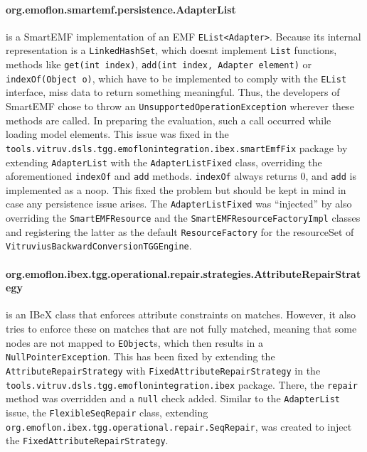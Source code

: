 \paragraph{org.emoflon.smartemf.persistence.AdapterList} is a SmartEMF implementation of an EMF \texttt{EList<Adapter>}.
Because its internal representation is a \texttt{LinkedHashSet}, which doesnt implement \texttt{List} functions, methods like \texttt{get(int index)}, \texttt{add(int index, Adapter element)} or \texttt{indexOf(Object o)}, which have to be implemented to comply with the \texttt{EList} interface, miss data to return something meaningful. Thus, the developers of SmartEMF chose to throw an \texttt{UnsupportedOperationException} wherever these methods are called.
In preparing the evaluation, such a call occurred while loading model elements.
This issue was fixed in the \texttt{tools.vitruv.dsls.tgg.emoflonintegration.ibex.smartEmfFix} package by extending \texttt{AdapterList} with the \texttt{AdapterListFixed} class, overriding the aforementioned \texttt{indexOf} and \texttt{add} methods. \texttt{indexOf} always returns $0$, and \texttt{add} is implemented as a noop. This fixed the problem but should be kept in mind in case any persistence issue arises.
The \texttt{AdapterListFixed} was \enquote{injected} by also overriding the \texttt{SmartEMFResource} and the \texttt{SmartEMFResourceFactoryImpl} classes and registering the latter as the default \texttt{ResourceFactory} for the resourceSet of \texttt{VitruviusBackwardConversionTGGEngine}.

\paragraph{org.emoflon.ibex.tgg.operational.repair.strategies.AttributeRepairStrategy} is an IBeX class that enforces attribute constraints on matches. However, it also tries to enforce these on matches that are not fully matched, meaning that some nodes are not mapped to \texttt{EObject}s, which then results in a \texttt{NullPointerException}.
This has been fixed by extending the \texttt{AttributeRepairStrategy} with \texttt{FixedAttributeRepairStrategy} in the \newline
\texttt{tools.vitruv.dsls.tgg.emoflonintegration.ibex} package. There, the \texttt{repair} method was overridden and a \texttt{null} check added.
Similar to the \texttt{AdapterList} issue, the \newline\texttt{FlexibleSeqRepair} class, extending 
\newline\texttt{org.emoflon.ibex.tgg.operational.repair.SeqRepair}, was created to inject the \newline\texttt{FixedAttributeRepairStrategy}.

